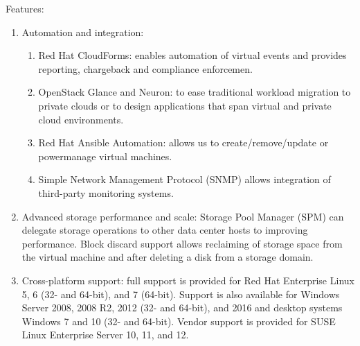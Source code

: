 
Features:
\begin{enumerate}
\item Automation and integration:
\begin{enumerate}
\item Red Hat CloudForms: enables automation of virtual events and provides reporting, chargeback and compliance enforcemen.
\item OpenStack Glance and Neuron: to ease traditional workload migration to private clouds or to design applications that span virtual and private cloud environments.
\item Red Hat Ansible Automation: allows us to create/remove/update or powermanage virtual machines.
\item Simple Network Management Protocol (SNMP) allows integration of third-party monitoring systems.
\end{enumerate}
\item Advanced storage performance and scale: Storage Pool Manager (SPM) can delegate storage operations to other data center hosts to improving performance. Block discard support allows reclaiming of storage space from the virtual machine and after deleting a disk from a storage domain.
\item Cross-platform support: full support is provided for Red Hat Enterprise Linux 5, 6 (32- and 64-bit), and 7 (64-bit). Support is also available for Windows Server 2008, 2008 R2, 2012 (32- and 64-bit), and 2016 and desktop systems Windows 7 and 10 (32- and 64-bit). Vendor support is provided for SUSE Linux Enterprise Server 10, 11, and 12.
\end{enumerate}



